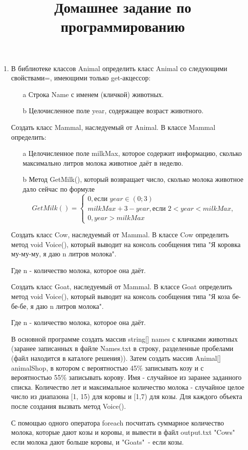 \documentclass[a4paper,12pt]{article} %
\author{}
\title{Домашнее задание по программированию}
\date{}
\begin{document}
	\maketitle
	
	\begin{enumerate}
		\item \noindent В библиотеке классов Animal определить класс Animal со следующими свойствами=, имеющими только get-акцессор:
		\begin{enumerate}
			\item[a] Строка Name с именем (кличкой) животных.
			\item[b] Целочисленное поле year, содержащее возраст животного.
		\end{enumerate}
		Создать класс Mammal, наследуемый от Animal. В классе Mammal определить:
		\begin{enumerate}
			\item[a] Целочисленное поле milkMax, которое содержит информацию, сколько максимально литров молока животное даёт в неделю.
			\item[b] Метод GetMilk(), который возвращает число, сколько молока животное дало сейчас по формуле
			\begin{equation*}
			GetMilk() = 
			\begin{cases}
			0, \text{если } year \in (0;3) 
			\\
			milkMax +3 - year,  \text{если }2 < year < milkMax,
			\\
			0, year> milkMax
			\end{cases}
			\end{equation*}
			
		\end{enumerate}
	Создать класс Cow, наследуемый от Mammal. В классе Cow определить метод void Voice(), который выводит на консоль сообщения типа "Я коровка му-му-му, я даю n литров молока". 
	
	Где n - количество молока, которое она даёт.
	
	Создать класс Goat, наследуемый от Mammal. В классе Goat определить метод void Voice(), который выводит на консоль сообщения типа "Я коза бе-бе-бе, я даю n литров молока". 
	
	Где n - количество молока, которое она даёт.
	
	В основной программе создать массив string[] names с кличками животных (заранее записанных в файле Names.txt в строку, разделенные пробелами (файл находится в каталоге решения)). Затем создать массив Animal[] animalShop, в котором с вероятностью 45\% записывать козу и с вероятностью 55\% записывать корову. Имя - случайное из заранее заданного списка. Количество лет и максимальное количество молока - случайное целое число из диапазона [1, 15) для коровы и [1,7) для козы. Для каждого объекта после создания вызвать метод Voice().
	
	С помощью одного оператора foreach посчитать суммарное количество молока, которые дают козы и коровы, и вывести в файл output.txt "Cows"\, если молока дают больше коровы, и "Goats"\ - если козы.
	
	
	\end{enumerate}
	
\end{document}
